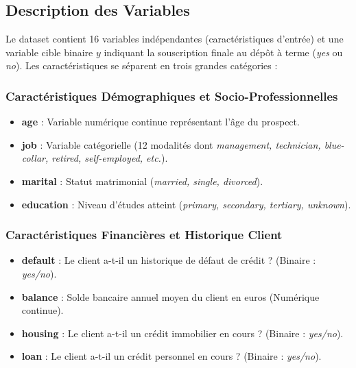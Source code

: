 \documentclass[12pt,a4paper]{article}
\begin{document}
\subsection{Description des Variables}
Le dataset contient 16 variables indépendantes (caractéristiques d'entrée) et une variable cible binaire $y$ indiquant la souscription finale au dépôt à terme (\emph{yes} ou \emph{no}). Les caractéristiques se séparent en trois grandes catégories :

\subsubsection{Caractéristiques Démographiques et Socio-Professionnelles}
\begin{itemize}
    \item \textbf{age} : Variable numérique continue représentant l'âge du prospect.
    \item \textbf{job} : Variable catégorielle (12 modalités dont \emph{management, technician, blue-collar, retired, self-employed, etc.}).
    \item \textbf{marital} : Statut matrimonial (\emph{married, single, divorced}).
    \item \textbf{education} : Niveau d'études atteint (\emph{primary, secondary, tertiary, unknown}).
\end{itemize}

\subsubsection{Caractéristiques Financières et Historique Client}
\begin{itemize}
    \item \textbf{default} : Le client a-t-il un historique de défaut de crédit ? (Binaire : \emph{yes/no}).
    \item \textbf{balance} : Solde bancaire annuel moyen du client en euros (Numérique continue).
    \item \textbf{housing} : Le client a-t-il un crédit immobilier en cours ? (Binaire : \emph{yes/no}).
    \item \textbf{loan} : Le client a-t-il un crédit personnel en cours ? (Binaire : \emph{yes/no}).
\end{itemize}
\end{document}
